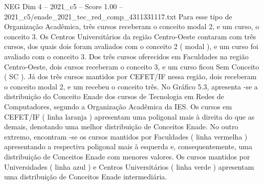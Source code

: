 \begin{textsample}{NEG Dim 4 – 2021\_c5 – Score 1.00 – 2021\_c5/enade\_2021\_tec\_red\_comp\_4311331117.txt}
Para esse tipo de Organização Acadêmica, três cursos receberam o conceito modal 2, e um curso, o conceito 3.
Os Centros Universitários da região Centro-Oeste contaram com três cursos, dos quais dois foram avaliados com o conceito 2 ( modal ), e um curso foi avaliado com o conceito 3.
Dos três cursos oferecidos em Faculdades na região Centro-Oeste, dois cursos receberam o conceito 3, e um curso ficou Sem Conceito ( SC ).
Já dos três cursos mantidos por CEFET/IF nessa região, dois receberam o conceito modal 2, e um recebeu o conceito três.
No Gráfico 5.3, apresenta -se a distribuição do Conceito Enade dos cursos de Tecnologia em Redes de Computadores, segundo a Organização Acadêmica da IES.
Os cursos em CEFET/IF ( linha laranja ) apresentam uma poligonal mais à direita do que as demais, denotando uma melhor distribuição de Conceitos Enade.
No outro extremo, encontram -se os cursos mantidos por Faculdades ( linha vermelha ) apresentando a respectiva poligonal mais à esquerda e, consequentemente, uma distribuição de Conceitos Enade com menores valores.
Os cursos mantidos por Universidades ( linha azul ) e Centros Universitários ( linha verde ) apresentam uma distribuição de Conceitos Enade intermediária.

\end{textsample}
